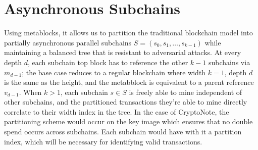 \documentclass{article}
\begin{document}
\section{Asynchronous Subchains}
Using metablocks, it allows us to partition the traditional blockchain model into partially asynchronous parallel subchains $S = (s_0, s_1, \ldots, s_{k-1})$ while maintaining a balanced tree that is resistant to adversarial attacks. At every depth $d$, each subchain top block has to reference the other $k-1$ subchains via $m_{d-1}$; the base case reduces to a regular blockchain where width $k = 1$, depth $d$ is the same as the height, and the metabblock is equivalent to a parent reference $v_{d-1}$. When $k > 1$, each subchain $s \in S$ is freely able to mine independent of other subchains, and the partitioned transactions they're able to mine directly correlate to their width index in the tree. In the case of CryptoNote\cite{saberhagen}, the partitioning scheme would occur on the key image which ensures that no double spend occurs across subchains. Each subchain would have with it a partition index, which will be necessary for identifying valid transactions.
\end{document}
